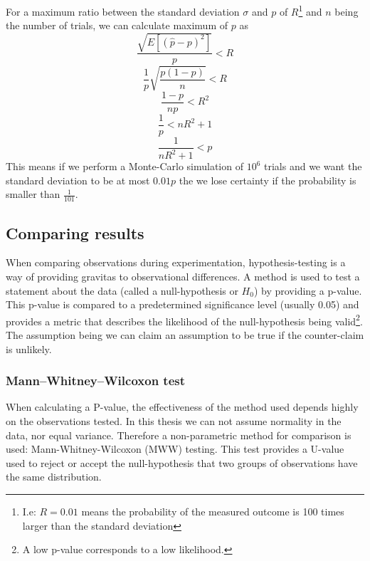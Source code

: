 For a maximum ratio between the standard deviation \(\sigma\) and \(p\) of \(R\)\footnote{I.e: \(R=0.01\) means the probability of the measured outcome is 100 times larger than the standard deviation} and \(n\) being the number of trials, we can calculate maximum of \(p\) as
\begin{equation*}
    \frac{\sqrt{E[(\hat{p}-p)^{2}]}}{p} < R
\end{equation*}
\begin{equation*}
    \frac{1}{p}\sqrt{\frac{p(1-p)}{n}} < R
\end{equation*}
\begin{equation*}
    \frac{1-p}{np} < R^{2}
\end{equation*}
\begin{equation*}
    \frac{1}{p}< nR^{2}+1
\end{equation*}
\begin{equation}
    \frac{1}{nR^{2}+1}<p
    \label{eq:montecarloP}
\end{equation}
This means if we perform a Monte-Carlo simulation of \(10^{6}\) trials and we want the standard deviation to be at most \(0.01p\) the we lose certainty if the probability is smaller than \(\frac{1}{101}\).

\subsection{Comparing results}
When comparing observations during experimentation, hypothesis-testing is a way of providing gravitas to observational differences. A method is used to test a statement about the data (called a null-hypothesis or \(H_{0}\)) by providing a p-value. This p-value is compared to a predetermined significance level (usually 0.05) and provides a metric that describes the likelihood of the null-hypothesis being valid\footnote{A low p-value corresponds to a low likelihood.}. The assumption being we can claim an assumption to be true if the counter-claim is unlikely.  

\subsubsection{Mann–Whitney–Wilcoxon test}
\label{background:mannwhitney}
When calculating a P-value, the effectiveness of the method used depends highly on the observations tested. In this thesis we can not assume normality in the data, nor equal variance. Therefore a non-parametric method for comparison is used: Mann-Whitney-Wilcoxon (MWW) testing. This test provides a U-value used to reject or accept the null-hypothesis that two groups of observations have the same distribution. 

